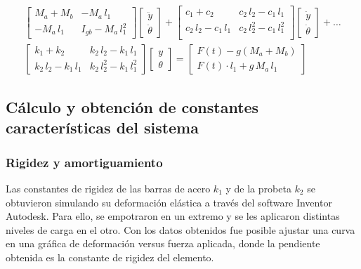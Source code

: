\begin{equation}\label{eq:mov_matriz}
\begin{split}
\begin{bmatrix}
	M_a + M_b	& -M_a\,l_1 \\
	-M_a\,l_1	& I_{gb} - M_a\,l_1^2
\end{bmatrix}
\begin{bmatrix}
	\ddot{y}\\
	\ddot{\theta}
\end{bmatrix} +
\begin{bmatrix}
	c_1 + c_2			& c_2\,l_2 - c_1\,l_1\\
	c_2\,l_2 - c_1\,l_1	& c_2\,l_2^2 - c_1\,l_1^2\\
\end{bmatrix}
\begin{bmatrix}
	\dot{y}\\
	\dot{\theta}
\end{bmatrix} + \dots \\
\begin{bmatrix}
	k_1 + k_2			& k_2\,l_2 - k_1\,l_1\\
	k_2\,l_2 - k_1\,l_1	& k_2\,l_2^2 - k_1\,l_1^2
\end{bmatrix}
\begin{bmatrix}
	y\\
	\theta
\end{bmatrix} =
\begin{bmatrix}
	F(t) - g(M_a + M_b)\\
	F(t)\cdot l_1 + g\,M_a\,l_1
\end{bmatrix}
\end{split}
\end{equation}

\subsection{Cálculo y obtención de constantes características del sistema}
 
\subsubsection{Rigidez y amortiguamiento} Las constantes de rigidez de las barras de acero $k_1$ y de la probeta $k_2$ se obtuvieron simulando su deformación elástica a través del software Inventor Autodesk. Para ello, se empotraron en un extremo y se les aplicaron distintas niveles de carga en el otro. Con los datos obtenidos fue posible ajustar una curva en una gráfica de deformación versus fuerza aplicada, donde la pendiente obtenida es la constante de rigidez del elemento. 

